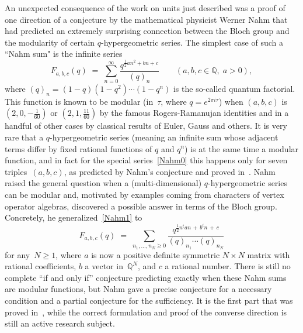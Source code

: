 \documentclass[12pt,reqno]{amsart}
\theoremstyle{definition}
\def\={\;=\;}
\def\+{\,+\,}
\def\be{\begin{equation}}
\def\ee{\end{equation}}
\def\Q{\mathbb Q}
\begin{document}
\bigskip


\smallskip\noindent
An unexpected consequence of the work on units just described was a proof of one direction
of a conjecture by the mathematical physicist Werner Nahm that had predicted an
extremely surprising connection between the Bloch group and the modularity of certain
$q$-hypergeometric series.  The simplest case of such a ``Nahm sum" is the infinite series
\be
\label{Nahm0}
F_{a,b,c}(q)\= \sum_{n=0}^\infty\frac{q^{\frac12an^2 +bn +c}}{(q)_n}
\qquad(a,b,c\in\Q,\; a>0),
\ee
where $(q)_n=(1-q)(1-q^2)\cdots(1-q^n)$ is the so-called quantum factorial. This function
is known to be modular (in~$\tau$, where $q=e^{2\pi i\tau}$) when $(a,b,c)$ is
$(2,0,-\frac1{60})$ or $(2,1,\frac{11}{60})$ by the famous Rogers-Ramanujan identities
and in a handful of other cases by classical results of Euler, Gauss and others.  It is very
rare that a $q$-hypergeometric series (meaning an infinite sum whose adjacent terms differ by
fixed rational functions of $q$ and $q^n$) is at the same time a modular function, and in fact
for the special series~\eqref{Nahm0} this happens only for seven triples~$(a,b,c)$,
as predicted by Nahm's conjecture and proved in~\cite{Z:dilogarithm}.  Nahm raised the
general question when a (multi-dimensional) $q$-hypergeometric series can be modular and,
motivated by examples coming from characters of vertex operator algebras, discovered a 
possible answer in terms of the Bloch group. Concretely, he generalized~\eqref{Nahm1} to
\be
\label{Nahm1} 
F_{a,b,c}(q)\= \sum_{n_1,\dots,n_N\ge0}
\frac{q^{\frac12n^tan\+b^tn\+c}}{(q)_{n_1}\cdots(q)_{n_N}}
\ee
for any~$N\ge1$, where $a$ is now a positive definite symmetric $N\times N$ matrix with
rational coefficients, $b$ a vector in~$\Q^N$, and $c$ a rational number. There is still no
complete ``if and only if'' conjecture predicting exactly when these Nahm sums are modular
functions, but Nahm gave a precise conjecture for a necessary condition and a partial
conjecture for the sufficiency.  It is the first part that was proved in~\cite{CGZ}, while
the correct formulation and proof of the converse direction is still an active research
subject. 
\end{document}
